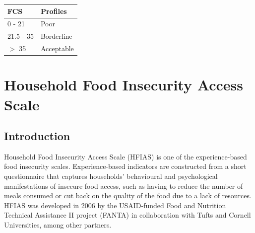\documentclass[12pt,]{book}
\theoremstyle{definition}
\theoremstyle{definition}
\theoremstyle{definition}
\theoremstyle{remark}
\begin{document}
\begin{longtable}[]{@{}ll@{}}
\toprule
\begin{minipage}[b]{0.27\columnwidth}\raggedright
\textbf{FCS}\strut
\end{minipage} & \begin{minipage}[b]{0.54\columnwidth}\raggedright
\textbf{Profiles}\strut
\end{minipage}\tabularnewline
\midrule
\endhead
\begin{minipage}[t]{0.27\columnwidth}\raggedright
0 - 21\strut
\end{minipage} & \begin{minipage}[t]{0.54\columnwidth}\raggedright
Poor\strut
\end{minipage}\tabularnewline
\begin{minipage}[t]{0.27\columnwidth}\raggedright
21.5 - 35\strut
\end{minipage} & \begin{minipage}[t]{0.54\columnwidth}\raggedright
Borderline\strut
\end{minipage}\tabularnewline
\begin{minipage}[t]{0.27\columnwidth}\raggedright
\(>\) 35\strut
\end{minipage} & \begin{minipage}[t]{0.54\columnwidth}\raggedright
Acceptable\strut
\end{minipage}\tabularnewline
\bottomrule
\end{longtable}

\hypertarget{hfias}{%
\chapter{Household Food Insecurity Access Scale}\label{hfias}}

\hypertarget{introduction-3}{%
\section{Introduction}\label{introduction-3}}

Household Food Insecurity Access Scale (HFIAS) is one of the
experience-based food insecurity scales. Experience-based indicators are
constructed from a short questionnaire that captures households'
behavioural and psychological manifestations of insecure food access,
such as having to reduce the number of meals consumed or cut back on the
quality of the food due to a lack of resources. HFIAS was developed in
2006 by the USAID-funded Food and Nutrition Technical Assistance II
project (FANTA) in collaboration with Tufts and Cornell Universities,
among other partners.
\end{document}
